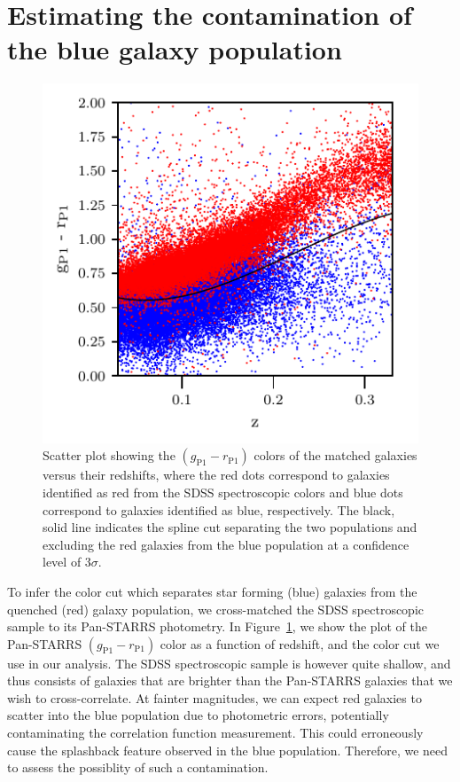 \documentclass[iop, apjl, twocolappendix, numberedappendix]{emulateapj}
\begin{document}
\section{Estimating the contamination of the blue galaxy population}
\label{sec:Errors}

\begin{figure}
    \includegraphics[width= \textwidth]{color_vs_z.pdf}
\caption{Scatter plot showing the $(g_{\mathrm{P1}}-r_{\mathrm{P1}})$ colors
of the matched galaxies versus their redshifts, where the red dots correspond
to galaxies identified as red from the SDSS spectroscopic colors and blue dots
correspond to galaxies identified as blue, respectively. The black, solid line
indicates the spline cut separating the two populations and excluding the red 
galaxies from the blue population at a confidence level of $3 \sigma$.}
   \label{fig:g-r_vs_z} 
\end{figure}

To infer the color cut which separates star forming (blue) galaxies from the
quenched (red) galaxy population, we cross-matched the SDSS spectroscopic
sample to its Pan-STARRS photometry. In Figure~\ref{fig:g-r_vs_z}, we show the
plot of the Pan-STARRS $(g_{\mathrm{P1}}-r_{\mathrm{P1}})$ color as a 
function of redshift, and the color cut we use in our analysis. 
The SDSS spectroscopic sample is however quite shallow, 
and thus consists of galaxies that are brighter than the Pan-STARRS 
galaxies that we wish to cross-correlate. At fainter magnitudes, we can 
expect red galaxies to scatter into the blue population 
due to photometric errors, potentially contaminating the
correlation function measurement. This could erroneously cause the
splashback feature observed in the blue population. Therefore, we
need to assess the possiblity of such a contamination. 
\end{document}
